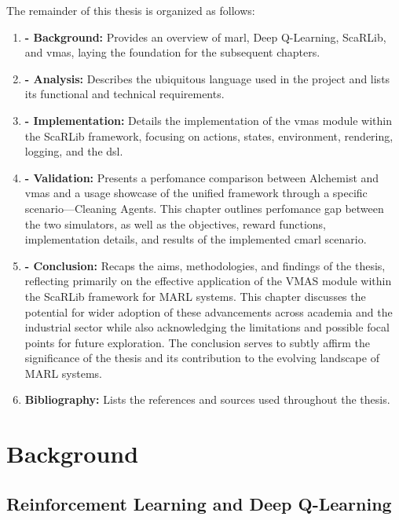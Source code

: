 \documentclass[12pt,a4paper,openright,twoside]{book}
\begin{document}
The remainder of this thesis is organized as follows:
\begin{enumerate}
    \item \textbf{ - Background:} Provides an overview of \ac{marl}, Deep Q-Learning, ScaRLib, and \ac{vmas}, laying the foundation for the subsequent chapters.
    \item \textbf{ - Analysis:} Describes the ubiquitous language used in the project and lists its functional and technical requirements.
    \item \textbf{ - Implementation:} Details the implementation of the \ac{vmas} module within the ScaRLib framework, focusing on actions, states, environment, rendering, logging, and the \ac{dsl}.
    \item \textbf{ - Validation:} Presents a perfomance comparison between Alchemist and \ac{vmas} and a usage showcase of the unified framework through a specific scenario—Cleaning Agents. This chapter outlines perfomance gap between the two simulators, as well as the objectives, reward functions, implementation details, and results of the implemented \ac{cmarl} scenario.
    \item \textbf{ - Conclusion:} Recaps the aims, methodologies, and findings of the thesis, reflecting primarily on the effective application of the VMAS module within the ScaRLib framework for MARL systems. This chapter discusses the potential for wider adoption of these advancements across academia and the industrial sector while also acknowledging the limitations and possible focal points for future exploration. The conclusion serves to subtly affirm the significance of the thesis and its contribution to the evolving landscape of MARL systems.
    \item \textbf{Bibliography:} Lists the references and sources used throughout the thesis.
\end{enumerate}

\chapter{Background} %
\label{chap:background}

\section{Reinforcement Learning and Deep Q-Learning}
\end{document}
